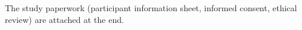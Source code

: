 \documentclass[conference]{IEEEtran}
\begin{document}




\appendix

The study paperwork (participant information sheet, informed consent, ethical review) are attached at the end.






\onecolumn



\end{document}
